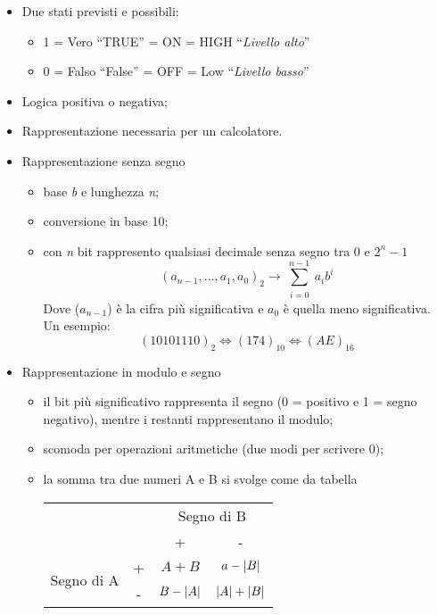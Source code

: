 \begin{itemize}
	\item Due stati previsti e possibili:
		\begin{itemize}
			\item 1 = Vero ``TRUE'' = ON = HIGH ``\textit{Livello alto}''
			\item 0 = Falso ``False'' = OFF = Low ``\textit{Livello basso}''
		\end{itemize}
	\item Logica positiva o negativa;
	\item Rappresentazione necessaria per un calcolatore.
	\item Rappresentazione senza segno
		\begin{itemize}
			\item base \textit{b} e lunghezza \textit{n};
			\item conversione in base 10;
			\item con \textit{n} bit rappresento qualsiasi decimale senza segno
				tra 0 e $2^n-1$
				\begin{equation}
					(a_{n-1},\dots, a_1,a_0)_2 \to
					\sum^{n-1}_{\substack{i=0}}a_ib^i
				\end{equation}
				Dove ($a_{n-1}$) è la cifra più significativa e $a_0$ è quella
				meno significativa.\\
				Un esempio:
				\begin{equation}
					(10101110)_2\Leftrightarrow (174)_{10} \Leftrightarrow
					(AE)_{16}
				\end{equation}
		\end{itemize}
	\item Rappresentazione in modulo e segno
		\begin{itemize}
			\item il bit più significativo rappresenta il segno (0 = positivo e
				1 = segno negativo), mentre i restanti rappresentano il modulo;
			\item scomoda per operazioni aritmetiche (due modi per scrivere 0);
			\item la somma tra due numeri A e B si svolge come da tabella
				\begin{table}[h!]
					\centering
					\begin{tabular}{l|ccc|}
						&&\multicolumn{2}{c|}{Segno di B} \\
						&&+&-\\
						\multirow{2}{*}{Segno di A}&+&$A+B$&$a-\lvert B\rvert$\\
						&-&$B-\lvert A\rvert$&$\lvert A\rvert +\lvert B\rvert$

\end{tabular}
\end{table}
\end{itemize}
\end{itemize}
